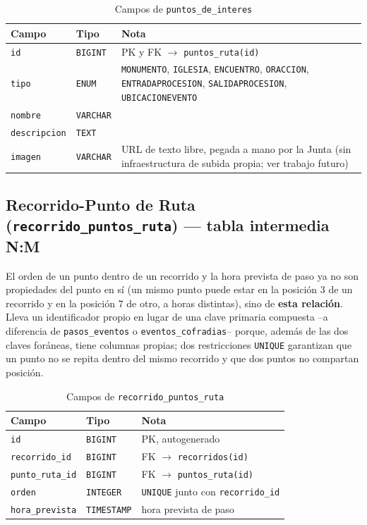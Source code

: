 \begin{table}[H]
\centering
\begin{tabular}{|l|l|p{7cm}|}
\hline
\textbf{Campo} & \textbf{Tipo} & \textbf{Nota} \\
\hline
\texttt{id} & \texttt{BIGINT} & PK y FK $\to$ \texttt{puntos\_ruta(id)} \\
\hline
\texttt{tipo} & \texttt{ENUM} & \texttt{MONUMENTO}, \texttt{IGLESIA}, \texttt{ENCUENTRO}, \texttt{ORACCION}, \texttt{ENTRADAPROCESION}, \texttt{SALIDAPROCESION}, \texttt{UBICACIONEVENTO} \\
\hline
\texttt{nombre} & \texttt{VARCHAR} &  \\
\hline
\texttt{descripcion} & \texttt{TEXT} &  \\
\hline
\texttt{imagen} & \texttt{VARCHAR} & URL de texto libre, pegada a mano por la Junta (sin infraestructura de subida propia; ver trabajo futuro) \\
\hline
\end{tabular}
\caption{Campos de \texttt{puntos\_de\_interes}}
\end{table}

\subsection{Recorrido-Punto de Ruta (\texttt{recorrido\_puntos\_ruta}) --- tabla intermedia N:M}\label{sec:recorridoPuntosRutaBD}
El orden de un punto dentro de un recorrido y la hora prevista de paso ya no son propiedades del punto en sí (un mismo punto puede estar en la posición 3 de un recorrido y en la posición 7 de otro, a horas distintas), sino de \textbf{esta relación}. Lleva un identificador propio en lugar de una clave primaria compuesta --a diferencia de \texttt{pasos\_eventos} o \texttt{eventos\_cofradias}-- porque, además de las dos claves foráneas, tiene columnas propias; dos restricciones \texttt{UNIQUE} garantizan que un punto no se repita dentro del mismo recorrido y que dos puntos no compartan posición.

\begin{table}[H]
\centering
\begin{tabular}{|l|l|p{7cm}|}
\hline
\textbf{Campo} & \textbf{Tipo} & \textbf{Nota} \\
\hline
\texttt{id} & \texttt{BIGINT} & PK, autogenerado \\
\hline
\texttt{recorrido\_id} & \texttt{BIGINT} & FK $\to$ \texttt{recorridos(id)} \\
\hline
\texttt{punto\_ruta\_id} & \texttt{BIGINT} & FK $\to$ \texttt{puntos\_ruta(id)} \\
\hline
\texttt{orden} & \texttt{INTEGER} & \texttt{UNIQUE} junto con \texttt{recorrido\_id} \\
\hline
\texttt{hora\_prevista} & \texttt{TIMESTAMP} & hora prevista de paso \\
\hline
\end{tabular}
\caption{Campos de \texttt{recorrido\_puntos\_ruta}}
\end{table}

